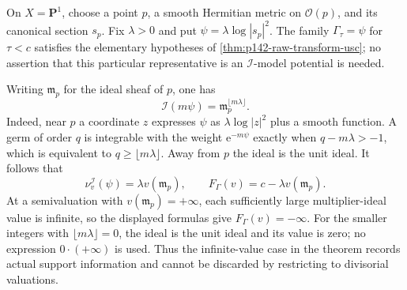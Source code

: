 \begin{example}\label{ex:p142-infinite-ideal-value}
On $X=\mathbf P^1$, choose a point $p$, a smooth Hermitian metric on
$\mathcal O(p)$, and its canonical section $s_p$. Fix $\lambda>0$ and
put $\psi=\lambda\log|s_p|^2$. The family $\Gamma_\tau=\psi$ for
$\tau<c$ satisfies the elementary hypotheses of
\cref{thm:p142-raw-transform-usc}; no assertion that this particular
representative is an $\mathcal I$-model potential is needed.

Writing $\mathfrak m_p$ for the ideal sheaf of $p$, one has
\[
       \mathcal I(m\psi)=\mathfrak m_p^{\lfloor m\lambda\rfloor}.
\]
Indeed, near $p$ a coordinate $z$ expresses $\psi$ as
$\lambda\log|z|^2$ plus a smooth function. A germ of order $q$ is
integrable with the weight $\mathrm e^{-m\psi}$ exactly when
$q-m\lambda>-1$, which is equivalent to $q\geq\lfloor m\lambda\rfloor$.
Away from $p$ the ideal is the unit ideal. It follows that
\[
 \nu_v^{\mathcal I}(\psi)=\lambda v(\mathfrak m_p),
 \qquad F_\Gamma(v)=c-\lambda v(\mathfrak m_p).
\]
At a semivaluation with $v(\mathfrak m_p)=+\infty$, each sufficiently
large multiplier-ideal value is infinite, so the displayed formulas give
$F_\Gamma(v)=-\infty$. For the smaller integers with
$\lfloor m\lambda\rfloor=0$, the ideal is the unit ideal and its value
is zero; no expression $0\cdot(+\infty)$ is used. Thus the infinite-value
case in the theorem records actual support information and cannot be
discarded by restricting to divisorial valuations.
\end{example}
